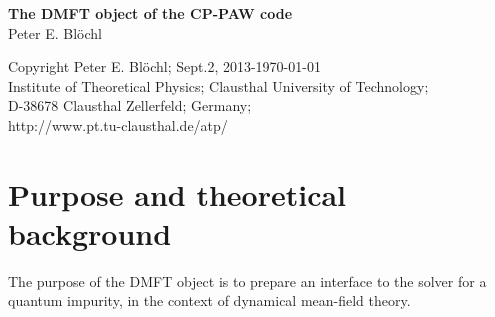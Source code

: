 \documentclass[11pt,a4paper]{report}
\begin{document}
\begin{titlepage}
\begin{center}
\vspace*{3.5cm}
{\huge \textbf{The DMFT object of the CP-PAW code}}\\
\vspace{0.5cm}
{\large Peter E. Bl\"ochl}
\vspace{0.5cm} 
\end{center}

\vfill
\begin{center}
Copyright Peter E. Bl\"ochl; Sept.2, 2013-\today\\
{\small
Institute of Theoretical Physics;
Clausthal University of Technology;\\ 
D-38678 Clausthal Zellerfeld; Germany;\\
http://www.pt.tu-clausthal.de/atp/}
\end{center}
\end{titlepage}
\noindent            
\tableofcontents
\chapter{Purpose and theoretical background}
The purpose of the DMFT object is to prepare an interface to the
solver for a quantum impurity, in the context of dynamical mean-field
theory.

\end{document}
